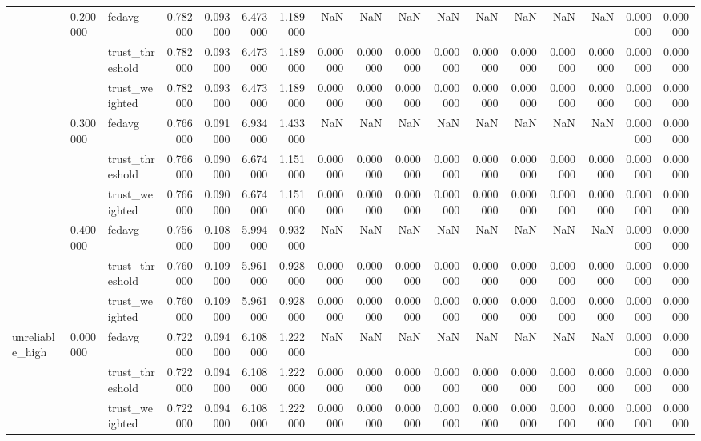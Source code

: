\begin{tabular}{lllrrrrrrrrrrrrrr}
\cline{2-17}
 & \multirow[t]{3}{*}{0.200000} & fedavg & 0.782000 & 0.093000 & 6.473000 & 1.189000 & NaN & NaN & NaN & NaN & NaN & NaN & NaN & NaN & 0.000000 & 0.000000 \\
 &  & trust_threshold & 0.782000 & 0.093000 & 6.473000 & 1.189000 & 0.000000 & 0.000000 & 0.000000 & 0.000000 & 0.000000 & 0.000000 & 0.000000 & 0.000000 & 0.000000 & 0.000000 \\
 &  & trust_weighted & 0.782000 & 0.093000 & 6.473000 & 1.189000 & 0.000000 & 0.000000 & 0.000000 & 0.000000 & 0.000000 & 0.000000 & 0.000000 & 0.000000 & 0.000000 & 0.000000 \\
\cline{2-17}
 & \multirow[t]{3}{*}{0.300000} & fedavg & 0.766000 & 0.091000 & 6.934000 & 1.433000 & NaN & NaN & NaN & NaN & NaN & NaN & NaN & NaN & 0.000000 & 0.000000 \\
 &  & trust_threshold & 0.766000 & 0.090000 & 6.674000 & 1.151000 & 0.000000 & 0.000000 & 0.000000 & 0.000000 & 0.000000 & 0.000000 & 0.000000 & 0.000000 & 0.000000 & 0.000000 \\
 &  & trust_weighted & 0.766000 & 0.090000 & 6.674000 & 1.151000 & 0.000000 & 0.000000 & 0.000000 & 0.000000 & 0.000000 & 0.000000 & 0.000000 & 0.000000 & 0.000000 & 0.000000 \\
\cline{2-17}
 & \multirow[t]{3}{*}{0.400000} & fedavg & 0.756000 & 0.108000 & 5.994000 & 0.932000 & NaN & NaN & NaN & NaN & NaN & NaN & NaN & NaN & 0.000000 & 0.000000 \\
 &  & trust_threshold & 0.760000 & 0.109000 & 5.961000 & 0.928000 & 0.000000 & 0.000000 & 0.000000 & 0.000000 & 0.000000 & 0.000000 & 0.000000 & 0.000000 & 0.000000 & 0.000000 \\
 &  & trust_weighted & 0.760000 & 0.109000 & 5.961000 & 0.928000 & 0.000000 & 0.000000 & 0.000000 & 0.000000 & 0.000000 & 0.000000 & 0.000000 & 0.000000 & 0.000000 & 0.000000 \\
\cline{1-17} \cline{2-17}
\multirow[t]{3}{*}{unreliable_high} & \multirow[t]{3}{*}{0.000000} & fedavg & 0.722000 & 0.094000 & 6.108000 & 1.222000 & NaN & NaN & NaN & NaN & NaN & NaN & NaN & NaN & 0.000000 & 0.000000 \\
 &  & trust_threshold & 0.722000 & 0.094000 & 6.108000 & 1.222000 & 0.000000 & 0.000000 & 0.000000 & 0.000000 & 0.000000 & 0.000000 & 0.000000 & 0.000000 & 0.000000 & 0.000000 \\
 &  & trust_weighted & 0.722000 & 0.094000 & 6.108000 & 1.222000 & 0.000000 & 0.000000 & 0.000000 & 0.000000 & 0.000000 & 0.000000 & 0.000000 & 0.000000 & 0.000000 & 0.000000 \\

\end{tabular}

